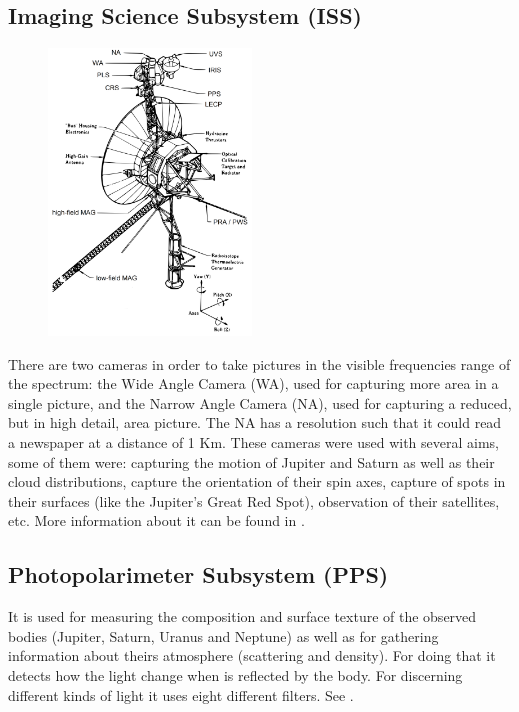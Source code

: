 \documentclass[11pt,a4paper]{article}
\begin{document}
\subsection{Imaging Science Subsystem (ISS)}
\begin{figure}
  \vspace{-10pt}
  \begin{center}
    \includegraphics[width=0.48\textwidth]{./voyagerstructure}
  \end{center}
  \vspace{-30pt}
  \caption{}
  \vspace{0pt}
\end{figure}
There are two cameras in order to take pictures in the visible frequencies range of the spectrum: the Wide Angle Camera (WA), used for capturing more area in a single picture, and the Narrow Angle Camera (NA), used for capturing a reduced, but in high detail, area picture. The NA has a resolution such that it could read a newspaper at a distance of 1 Km. These cameras were used with several aims, some of them were: capturing the motion of Jupiter and Saturn as well as their cloud distributions, capture the orientation of their spin axes, capture of spots in their surfaces (like the Jupiter’s Great Red Spot), observation of their satellites, etc. More information about it can be found in \cite{ISS}.

\subsection{Photopolarimeter Subsystem (PPS)}
It is used for measuring the composition and surface texture of the observed bodies (Jupiter, Saturn, Uranus and Neptune) as well as for gathering information about theirs atmosphere (scattering and density). For doing that it detects how the light change when is reflected by the body. For discerning different kinds of light it uses eight different filters. See \cite{PPS}.
\end{document}
